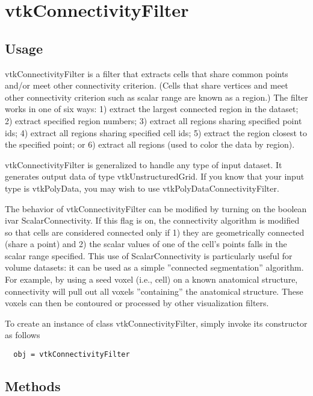 \section{vtkConnectivityFilter}

\subsection{Usage}

 vtkConnectivityFilter is a filter that extracts cells that share common
 points and/or meet other connectivity criterion. (Cells that share
 vertices and meet other connectivity criterion such as scalar range are
 known as a region.)  The filter works in one of six ways: 1) extract the
 largest connected region in the dataset; 2) extract specified region
 numbers; 3) extract all regions sharing specified point ids; 4) extract
 all regions sharing specified cell ids; 5) extract the region closest to
 the specified point; or 6) extract all regions (used to color the data by
 region).

 vtkConnectivityFilter is generalized to handle any type of input dataset.
 It generates output data of type vtkUnstructuredGrid. If you know that
 your input type is vtkPolyData, you may wish to use
 vtkPolyDataConnectivityFilter.

 The behavior of vtkConnectivityFilter can be modified by turning on the
 boolean ivar ScalarConnectivity. If this flag is on, the connectivity
 algorithm is modified so that cells are considered connected only if 1)
 they are geometrically connected (share a point) and 2) the scalar values
 of one of the cell's points falls in the scalar range specified. This use
 of ScalarConnectivity is particularly useful for volume datasets: it can
 be used as a simple ''connected segmentation'' algorithm. For example, by
 using a seed voxel (i.e., cell) on a known anatomical structure,
 connectivity will pull out all voxels ''containing'' the anatomical
 structure. These voxels can then be contoured or processed by other
 visualization filters.

To create an instance of class vtkConnectivityFilter, simply
invoke its constructor as follows
\begin{verbatim}
  obj = vtkConnectivityFilter
\end{verbatim}
\subsection{Methods}

